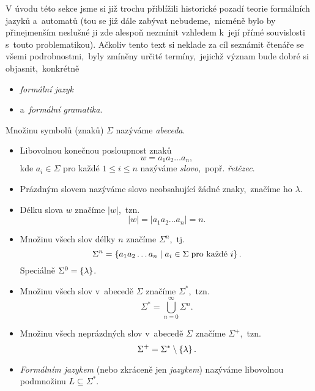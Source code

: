 V úvodu této sekce jsme si již trochu přiblížili historické pozadí teorie formálních jazyků a~automatů (tou se již dále zabývat nebudeme,~nicméně bylo by přinejmenším neslušné ji zde alespoň nezmínit vzhledem k~její přímé souvislosti s~touto problematikou). Ačkoliv tento text si neklade za cíl seznámit čtenáře se všemi podrobnostmi,~byly zmíněny určité termíny,~jejichž význam bude dobré si objasnit,~konkrétně
\begin{itemize}
    \item \emph{formální jazyk}
    \item a~\emph{formální gramatika}.
\end{itemize}
\begin{definition}\label{def:formalni-jazyk-etc}
    Množinu symbolů (znaků) $\Sigma$ nazýváme \emph{abeceda}.
    \begin{itemize}
        \item Libovolnou konečnou posloupnost znaků
        \[w=a_1a_2\ldots a_n,\]
        kde $a_i\in\Sigma$ pro každé $1\leqslant i\leqslant n$ nazýváme \emph{slovo},~popř. \emph{řetězec}.
        \item Prázdným slovem nazýváme slovo neobsahující žádné znaky,~značíme ho $\lambda$.
        \item Délku slova $w$ značíme $|w|$,~tzn.
        \[|w|=|a_1a_2\ldots a_n|=n.\]
        \item Množinu všech slov délky $n$ značíme $\Sigma^n$,~tj.
        \[\Sigma^n=\left\{a_1a_2\ldots a_n\mid a_i\in\Sigma\;\text{pro každé $i$}\right\}.\]
        Speciálně $\Sigma^0=\left\{\lambda\right\}$.
        \item Množinu všech slov v~abecedě $\Sigma$ značíme $\Sigma^*$,~tzn.
        \[\Sigma^*=\bigcup_{n=0}^\infty\Sigma^n.\]
        \item Množinu všech neprázdných slov v~abecedě $\Sigma$ značíme $\Sigma^+$,~tzn.
        \[\Sigma^+=\Sigma^*\setminus\left\{\lambda\right\}.\]
        \item \emph{Formálním jazykem} (nebo zkráceně jen \emph{jazykem}) nazýváme libovolnou podmnožinu $L\subseteq\Sigma^*$.
    \end{itemize}
\end{definition}
